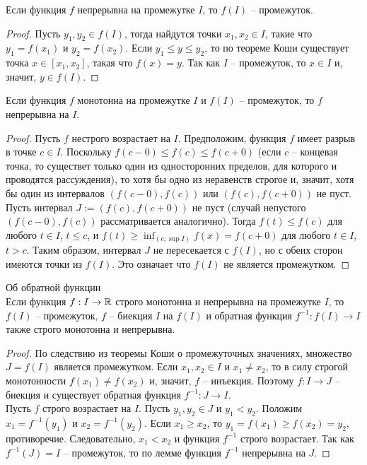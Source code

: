     \begin{corollary}
        Если функция $f$ непрерывна на промежутке $I$, то $f(I)$ -- промежуток.
    \end{corollary}

    \begin{proof}
        Пусть $y_{1}, y_{2} \in f(I)$, тогда найдутся точки $x_{1}, x_{2} \in I$, такие что $y_{1} = f(x_{1})$ и $y_{2} = f(x_{2})$. Если $y_{1} \leq y \leq y_{2}$, то по теореме Коши существует точка $x \in [x_{1}, x_{2}]$, такая что $f(x) = y$. Так как $I$ -- промежуток, то $x \in I$ и, значит, $y \in f(I)$.
    \end{proof}

    \begin{lemma}
        Если функция $f$ монотонна на промежутке $I$ и $f(I)$ -- промежуток, то $f$ непрерывна на $I$.
    \end{lemma}

    \begin{proof}
        Пусть $f$ нестрого возрастает на $I$. Предположим, функция $f$ имеет разрыв в точке $c \in I$. Поскольку $f(c - 0) \leq f(c) \leq f(c + 0)$ (если $c$ -- концевая точка, то существет только один из односторонних пределов, для которого и проводятся рассуждения), то хотя бы одно из неравенств строгое и, значит, хотя бы один из интервалов $(f(c - 0), f(c))$ или $(f(c), f(c + 0))$ не пуст.\\
        Пусть интервал $J :=(f(c), f(c + 0))$ не пуст (случай непустого $(f(c-0), f(c))$ рассматривается аналогично). Тогда $f(t) \leq f(c)$ для любого $t \in I$, $t \leq c$, и $f(t) \geq \inf_{(c, \sup I)}f(x) = f(c + 0)$ для любого $t \in I$, $t > c$. Таким образом, интервал $J$ не пересекается с $f(I)$, но с обеих сторон имеются точки из $f(I)$. Это означает что $f(I)$ не является промежутком. 
    \end{proof}

    \begin{theorem}{Об обратной функции}\\
        Если функция $f: I \to \mathbb{R}$ строго монотонна и непрерывна на промежутке $I$, то $f(I)$ -- промежуток, $f$ -- биекция $I$ на $f(I)$ и обратная функция $f^{-1}: f(I) \to I$ также строго монотонна и непрерывна. 
    \end{theorem}

    \begin{proof}
        По следствию из теоремы Коши о промежуточных значениях, множество $J = f(I)$ является промежутком. Если $x_{1}, x_{2} \in I$ и $x_{1} \neq x_{2}$, то в силу строгой монотонности $f(x_{1}) \neq f(x_{2})$ и, значит, $f$ -- инъекция. Поэтому $f: I \to J$ -- биекция и существует обратная функция $f^{-1}: J \to I$.\\
        Пусть $f$ строго возрастает на $I$. Пусть $y_{1}, y_{2} \in J$ и $y_{1} < y_{2}$. Положим $x_{1} = f^{-1}(y_{1})$ и $x_{2} = f^{-1}(y_{2})$. Если $x_{1} \geq x_{2}$, то $y_{1} = f(x_{1}) \geq f(x_{2}) = y_{2}$, противоречие. Следовательно, $x_{1} < x_{2}$ и функция $f^{-1}$ строго возрастает. Так как $f^{-1}(J) = I$ -- промежуток, то по лемме функция $f^{-1}$ непрерывна на $J$.
    \end{proof}

